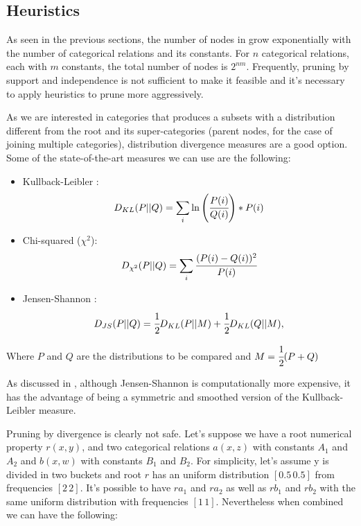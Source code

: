 \subsection{Heuristics}

As seen in the previous sections, the number of nodes in \graphname grow exponentially with the number of categorical relations and its constants. For $n$ categorical relations, each with $m$ constants, the total number of nodes is $2^{nm}$. Frequently, pruning by support and independence is not sufficient to make it feasible and it's necessary to apply heuristics to prune more aggressively.

As we are interested in categories that produces a subsets with a distribution different from the root and its super-categories (parent nodes, for the case of joining multiple categories), distribution divergence measures are a good option. Some of the state-of-the-art measures we can use are the following:

\begin{itemize}
 \item Kullback-Leibler \cite{Kullback51klDivergence}: 
    \begin{equation}
      D_{KL}(P||Q)=\sum_{\substack{i}}\ln\left(\cfrac{P(i)}{Q(i)}\right)*P(i)
    \end{equation}
 \item Chi-squared ($\chi^2$):
    \begin{equation}
      D_{\chi^2}(P||Q)=\sum_{\substack{i}}\cfrac{(P(i)-Q(i))^2}{P(i)}
    \end{equation}
 \item Jensen-Shannon \cite{17795}:
    \begin{equation}
      D_{JS}(P||Q)=\cfrac{1}{2}D_{KL}(P||M)+\cfrac{1}{2}D_{KL}(Q||M), 
    \end{equation}
\end{itemize}

Where $P$ and $Q$ are the distributions to be compared and $M=\cfrac{1}{2}(P+Q)$

As discussed in \cite{17795}, although Jensen-Shannon is computationally more expensive, it has the advantage of being a
symmetric and smoothed version of the Kullback-Leibler measure.

Pruning by divergence is clearly not safe. Let's suppose we have a root numerical property $r(x,y)$, and two categorical relations $a(x,z)$ with constants $A_1$ and $A_2$ and $b(x,w)$ with constants $B_1$ and $B_2$. For simplicity, let's assume y is divided in two buckets and root $r$ has an uniform distribution $[0.5 \, 0.5]$ from frequencies $[2 \, 2]$. It's possible to have $r a_1$ and $r a_2$ as well as $r b_1$ and $r b_2$ with the same uniform distribution with frequencies $[1 \, 1]$. Nevertheless when combined we can have the following:

